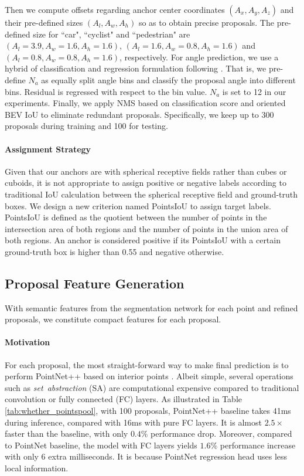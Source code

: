 \documentclass[10pt,twocolumn,letterpaper]{article}
\begin{document}
Then we compute offsets regarding anchor center coordinates $(A_x, A_y, A_z)$ and their pre-defined sizes $(A_l, A_w, A_h)$ so as to obtain precise proposals. 
The pre-defined size for ``car", ``cyclist" and ``pedestrian" are $(A_l=3.9, A_w=1.6, A_h=1.6)$, $(A_l=1.6, A_w=0.8, A_h=1.6)$ and $(A_l=0.8, A_w=0.8, A_h=1.6)$, respectively. 
For angle prediction, we use a hybrid of classification and regression formulation following \cite{FPOINTNET}. That is, we pre-define $N_a$ as equally split angle bins and classify the proposal angle into different bins. Residual is regressed with respect to the bin value. $N_a$ is set to 12 in our experiments. Finally, we apply NMS based on classification score and oriented BEV IoU to eliminate redundant proposals. Specifically, we keep up to 300 proposals during training and 100 for testing. 


\vspace{-0.1in}
\paragraph{Assignment Strategy}
Given that our anchors are with spherical receptive fields rather than cubes or cuboids, it is not appropriate to assign positive or negative labels according to traditional IoU calculation \cite{VOXELNET} between the spherical receptive field and ground-truth boxes. We design a new criterion named PointsIoU to assign target labels. PointsIoU is defined as the quotient between the number of points in the intersection area of both regions and the number of points in the union area of both regions.
An anchor is considered positive if its PointsIoU with a certain ground-truth box is higher than 0.55 and negative otherwise. 


\subsection{Proposal Feature Generation}
With semantic features from the segmentation network for each point and refined proposals, we constitute compact features for each proposal. 

\vspace{-0.1in}
\paragraph{Motivation}
For each proposal, the most straight-forward way to make final prediction is to perform PointNet++ based on interior points \cite{shi2018pointrcnn,FPOINTNET}. Albeit simple, several operations such as {\it set\ abstraction} (SA) are computational expensive compared to traditional convolution or fully connected (FC) layers. As illustrated in Table \ref{tab:whether_pointspool}, with 100 proposals, PointNet++ baseline takes 41ms during inference, compared with 16ms with pure FC layers. It is almost $2.5 \times$ faster than the baseline, with only $0.4\%$ performance drop. Moreover, compared to PointNet baseline, the model with FC layers yields $1.6 \%$ performance increase with only 6 extra milliseconds. It is because PointNet regression head uses less local information. 
\end{document}
